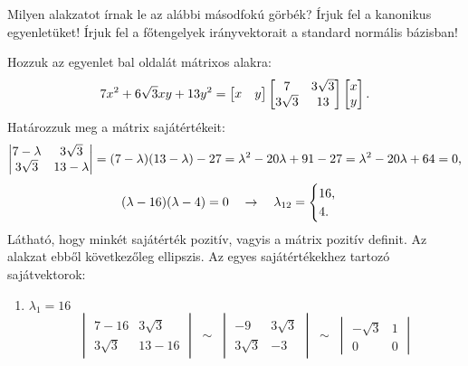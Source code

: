 \begin{exercise}{%
    Milyen alakzatot írnak le az alábbi másodfokú görbék?
    Írjuk fel a kanonikus egyenletüket!
    Írjuk fel a főtengelyek irányvektorait a standard normális bázisban!
  }
{\begin{enumerate}[a)]
            Hozzuk az egyenlet bal oldalát mátrixos alakra:
            \[
              7x^2 + 6\sqrt{3} xy + 13y^2 =
              \begin{bmatrix} x & y \end{bmatrix}
              \begin{bmatrix} 7 & 3\sqrt{3} \\ 3\sqrt{3} & 13 \end{bmatrix}
              \begin{bmatrix} x \\ y \end{bmatrix}
              \text.
            \]
            Határozzuk meg a mátrix sajátértékeit:
            \[
              \begin{vmatrix} 7 - \lambda & 3\sqrt{3} \\ 3\sqrt{3} & 13 - \lambda \end{vmatrix}
              = (7 - \lambda)(13 - \lambda) - 27
              = \lambda^2 - 20 \lambda + 91 - 27
              = \lambda^2 - 20 \lambda + 64
              = 0
              \text,
            \]
            \[
              (\lambda - 16)(\lambda - 4) = 0
              \quad \rightarrow \quad
              \lambda_{12} = \begin{cases}
                16 \text, \\
                4 \text.
              \end{cases}
            \]
            Látható, hogy minkét sajátérték pozitív, vagyis a mátrix pozitív
            definit. Az alakzat ebből következőleg ellipszis.
            Az egyes sajátértékekhez tartozó sajátvektorok:
            \begin{enumerate}[1)]
              \item $\lambda_1 = 16$
                    \[
                      \begin{vmatrix}
                        7 - 16     & 3 \sqrt{3} \\
                        3 \sqrt{3} & 13 - 16
                      \end{vmatrix} \;\sim\; \begin{vmatrix}
                        -9         & 3 \sqrt{3} \\
                        3 \sqrt{3} & -3
                      \end{vmatrix} \;\sim\; \begin{vmatrix}
                        -\sqrt{3} & 1 \\
                        0         & 0

\end{vmatrix}\]
\end{enumerate}
\end{enumerate}}
\end{exercise}
